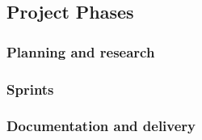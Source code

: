 \subsection{Project Phases}

\subsubsection{Planning and research}
\subsubsection{Sprints}
\subsubsection{Documentation and delivery}